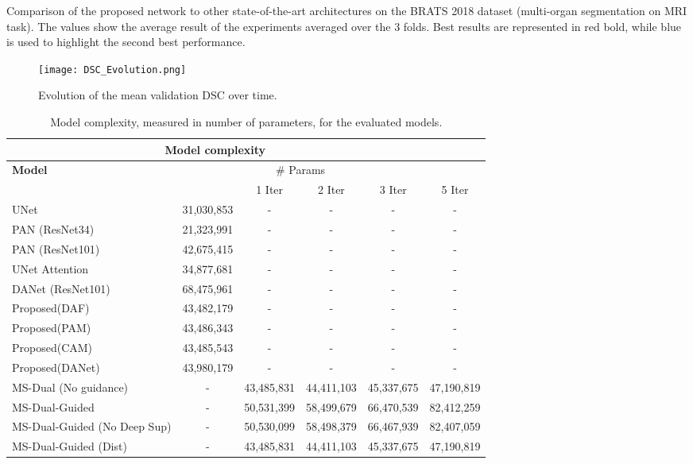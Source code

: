 \documentclass[journal]{IEEEtran}
\begin{document}
\begin{table*}[t!]
\caption{Comparison of the proposed network to other state-of-the-art architectures on the BRATS 2018 dataset (multi-organ segmentation on MRI task). The values show the average result of the experiments averaged over the 3 folds. Best results are represented in red bold, while blue is used to highlight the second best performance.}
\label{table:sota_comp_supplemental_brats}
\end{table*}


\begin{figure}[h!]
    \centering
    \texttt{[image: DSC\_Evolution.png]}
    \caption{Evolution of the mean validation DSC over time.}
    \label{fig:DSC_Evolution}
\end{figure}


\begin{table}[]
    \centering
    \begin{tabular}{l|ccccc}
    \toprule
 \multicolumn{5}{c}{\textbf{Model complexity}}\\
 \midrule
 \textbf{Model} &  \multicolumn{4}{c}{\# Params}\\
 & & 1 Iter & 2 Iter & 3 Iter & 5 Iter\\
  \midrule
  UNet & 31,030,853 & - & - &- & - \\
  PAN (ResNet34) & 21,323,991 & - & - &- & - \\
  PAN (ResNet101) & 42,675,415 & - & - &- & - \\
  UNet Attention & 34,877,681 & - & - &- & - \\
  DANet (ResNet101) & 68,475,961 & - & - & - & - \\
  Proposed(DAF) & 43,482,179 & - & - &- & - \\
  Proposed(PAM) & 43,486,343 & - & - &- & - \\
  Proposed(CAM) & 43,485,543 & - & - &- & - \\
  Proposed(DANet) & 43,980,179 & - & - &- & - \\
  MS-Dual (No guidance) & - & 43,485,831 & 44,411,103 & 45,337,675 & 47,190,819 \\
  MS-Dual-Guided & - & 50,531,399 & 58,499,679 &  66,470,539 & 82,412,259\\
  MS-Dual-Guided (No Deep Sup)& - & 50,530,099 & 58,498,379 & 66,467,939  & 82,407,059 \\
  MS-Dual-Guided (Dist) & - & 43,485,831 & 44,411,103 & 45,337,675  & 47,190,819\\

\bottomrule
    \end{tabular}
    \caption{Model complexity, measured in number of parameters, for the evaluated models.}
    \label{tab:complexity}
\end{table}
\end{document}
